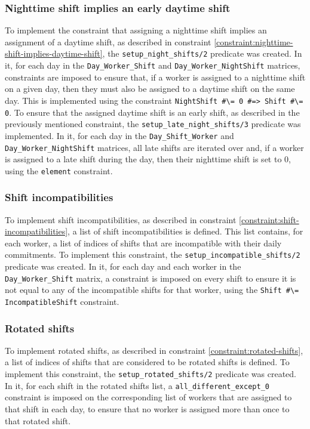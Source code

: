\documentclass[conference]{IEEEtran}
\def\constraint#1{\vspace{4pt} {#1}}
\begin{document}
\constraint {
    \subsubsection*{Nighttime shift implies an early daytime shift}
    To implement the constraint that assigning a nighttime shift implies an assignment of a daytime shift, as described in constraint \ref{constraint:nighttime-shift-implies-daytime-shift}, the \texttt{setup\_night\_shifts/2} predicate was created. In it, for each day in the \texttt{Day\_Worker\_Shift} and \texttt{Day\_Worker\_NightShift} matrices, constraints are imposed to ensure that, if a worker is assigned to a nighttime shift on a given day, then they must also be assigned to a daytime shift on the same day. This is implemented using the constraint \texttt{NightShift \#\textbackslash= 0 \#=> Shift \#\textbackslash= 0}. To ensure that the assigned daytime shift is an early shift, as described in the previously mentioned constraint, the \texttt{setup\_late\_night\_shifts/3} predicate was implemented. In it, for each day in the \texttt{Day\_Shift\_Worker} and \texttt{Day\_Worker\_NightShift} matrices, all late shifts are iterated over and, if a worker is assigned to a late shift during the day, then their nighttime shift is set to 0, using the \texttt{element} constraint.
}

\constraint {
    \subsubsection*{Shift incompatibilities}   
    To implement shift incompatibilities, as described in constraint \ref{constraint:shift-incompatibilities}, a list of shift incompatibilities is defined. This list contains, for each worker, a list of indices of shifts that are incompatible with their daily commitments.
    To implement this constraint, the \texttt{setup\_incompatible\_shifts/2} predicate was created. In it, for each day and each worker in the \texttt{Day\_Worker\_Shift} matrix, a constraint is imposed on every shift to ensure it is not equal to any of the incompatible shifts for that worker, using the \texttt{Shift \#\textbackslash= IncompatibleShift} constraint.
}

\constraint {
    \subsubsection*{Rotated shifts}
    To implement rotated shifts, as described in constraint \ref{constraint:rotated-shifts}, a list of indices of shifts that are considered to be rotated shifts is defined.
    To implement this constraint, the \texttt{setup\_rotated\_shifts/2} predicate was created. In it, for each shift in the rotated shifts list, a \texttt{all\_different\_except\_0} constraint is imposed on the corresponding list of workers that are assigned to that shift in each day, to ensure that no worker is assigned more than once to that rotated shift.
}
\end{document}
